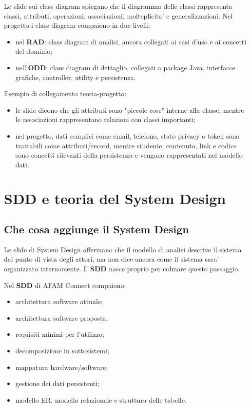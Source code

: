 ﻿\documentclass[11pt,a4paper]{article}
\newcommand{\doc}[1]{\textbf{#1}}
\begin{document}
Le slide sui class diagram spiegano che il diagramma delle classi rappresenta classi,
attributi, operazioni, associazioni, molteplicita' e generalizzazioni. Nel progetto i
class diagram compaiono in due livelli:
\begin{itemize}
  \item nel \doc{RAD}: class diagram di analisi, ancora collegati ai casi d'uso e ai
  concetti del dominio;
  \item nell'\doc{ODD}: class diagram di dettaglio, collegati a package Java,
  interfacce grafiche, controller, utility e persistenza.
\end{itemize}

Esempio di collegamento teoria-progetto:
\begin{itemize}
  \item le slide dicono che gli attributi sono "piccole cose" interne alla classe, mentre le
  associazioni rappresentano relazioni con classi importanti;
  \item nel progetto, dati semplici come email, telefono, stato privacy o token sono
  trattabili come attributi/record, mentre studente, contenuto, link e codice sono concetti
  rilevanti della persistenza e vengono rappresentati nel modello dati.
\end{itemize}

\section{SDD e teoria del System Design}

\subsection{Che cosa aggiunge il System Design}

Le slide di System Design affermano che il modello di analisi descrive il sistema dal
punto di vista degli attori, ma non dice ancora come il sistema sara' organizzato
internamente. Il \doc{SDD} nasce proprio per colmare questo passaggio.

Nel \doc{SDD} di AFAM Connect compaiono:
\begin{itemize}
  \item architettura software attuale;
  \item architettura software proposta;
  \item requisiti minimi per l'utilizzo;
  \item decomposizione in sottosistemi;
  \item mappatura hardware/software;
  \item gestione dei dati persistenti;
  \item modello ER, modello relazionale e struttura delle tabelle.
\end{itemize}
\end{document}
